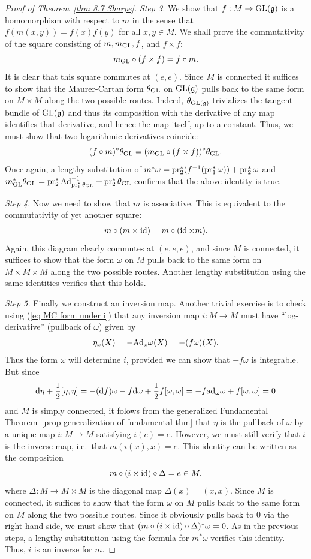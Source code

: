 \begin{proof}[Proof of Theorem~\ref{thm 8.7 Sharpe}]
    \emph{Step 3.} We show that $f:M\to \operatorname{GL}(\mathfrak{g})$ is a homomorphism with respect to $m$ in the sense that $f(m(x,y))=f(x)f(y)$ for all $x,y\in M$. We shall prove the commutativity of the square consisting of $m,m_{\operatorname{GL}},f$, and $f\times f$:
    \[m_{\operatorname{GL}}\circ (f\times f)=f\circ m.\]
    It is clear that this square commutes at $(e,e)$. Since $M$ is connected it suffices to show that the Maurer-Cartan form $\theta_{\operatorname{GL}}$ on $\operatorname{GL}(\mathfrak{g})$ pulls back to the same form on $M\times M$ along the two possible routes. Indeed, $\theta_{\operatorname{GL}(\mathfrak{g})}$ trivializes the tangent bundle of $\operatorname{GL}(\mathfrak{g})$ and thus its composition with the derivative of any map identifies that derivative, and hence the map itself, up to a constant. Thus, we must show that two logarithmic derivatives coincide:
    \[(f\circ m)^\ast\theta_{\operatorname{GL}}=(m_{\operatorname{GL}}\circ (f\times f))^\ast \theta_{\operatorname{GL}}.\]
    Once again, a lengthy substitution of $m^\ast\omega=\operatorname{pr}_2^\ast(f^{-1}(\operatorname{pr}_1^\ast\omega))+\operatorname{pr}_2^\ast\omega$ and $m_{\operatorname{GL}}^\ast\theta_{\operatorname{GL}}=\operatorname{pr}_2^\ast \mathrm{Ad}^{-1}_{\operatorname{pr}_1^\ast\theta_{\operatorname{GL}}}+\operatorname{pr}_2^\ast \theta_{\operatorname{GL}}$ confirms that the above identity is true.

    \emph{Step 4}. Now we need to show that $m$ is associative. This is equivalent to the commutativity of yet another square:
    \[m\circ (m\times \operatorname{id})=m\circ (\operatorname{id}\times m).\]
    Again, this diagram clearly commutes at $(e,e,e)$, and since $M$ is connected, it suffices to show that the form $\omega$ on $M$ pulls back to the same form on $M\times M\times M$ along the two possible routes. Another lengthy substitution using the same identities verifies that this holds.

    \emph{Step 5.} Finally we construct an inversion map. Another trivial exercise is to check using (\ref{eq MC form under i}) that any inversion map $i:M\to M$ must have ``log-derivative'' (pullback of $\omega$) given by
    \[\eta_x(X)=-\mathrm{Ad}_x\omega(X)=-(f\omega)(X).\]
    Thus the form $\omega$ will determine $i$, provided we can show that $-f\omega$ is integrable. But since
    \[{\mathrm{d}}\eta+\frac12[\eta,\eta]=-({\mathrm{d}} f)\omega -f{\mathrm{d}} \omega+\frac12 f[\omega,\omega]=-f\mathrm{ad}_\omega\omega +f[\omega,\omega]=0\]
    and $M$ is simply connected, it folows from the generalized Fundamental Theorem~\ref{prop generalization of fundamental thm} that $\eta$ is the pullback of $\omega$ by a unique map $i:M\to M$ satisfying $i(e)=e$. However, we must still verify that $i$ is the inverse map, i.e.\ that $m(i(x),x)=e$. This identity can be written as the composition
    \[m\circ(i\times\operatorname{id})\circ\Delta=e\in M,\]
    where $\Delta:M\to M\times M$ is the diagonal map $\Delta(x)=(x,x)$. Since $M$ is connected, it suffices to show that the form $\omega$ on $M$ pulls back to the same form on $M$ along the two possible routes. Since it obviously pulls back to $0$ via the right hand side, we must show that $(m\circ(i\times\operatorname{id})\circ\Delta)^\ast\omega=0$. As in the previous steps, a lengthy substitution using the formula for $m^\ast\omega$ verifies this identity. Thus, $i$ is an inverse for $m$.


\end{proof}
